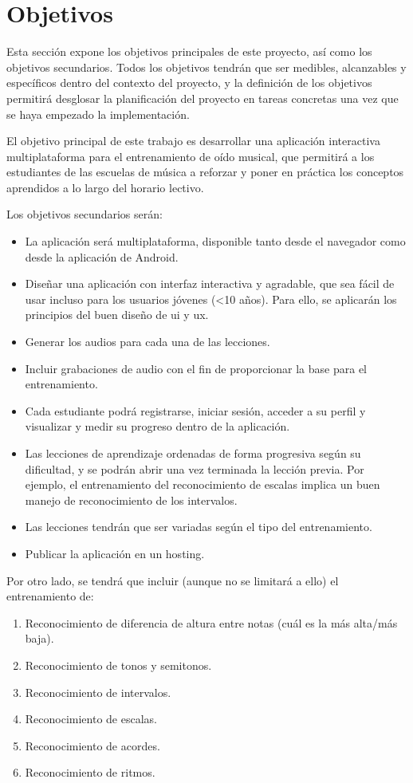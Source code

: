 \section{Objetivos}
\label{objetivos}
Esta sección expone los objetivos principales de este proyecto, así como los objetivos secundarios. Todos los objetivos tendrán que ser medibles, alcanzables y específicos dentro del contexto del proyecto, y la definición de los objetivos permitirá desglosar la planificación del proyecto en tareas concretas una vez que se haya empezado la implementación.
\par El objetivo principal de este trabajo es desarrollar una aplicación interactiva multiplataforma para el entrenamiento de oído musical, que permitirá a los estudiantes de las escuelas de música a reforzar y poner en práctica los conceptos aprendidos a lo largo del horario lectivo.
\par Los objetivos secundarios serán:
\begin{itemize}
	\item La aplicación será multiplataforma, disponible tanto desde el navegador como desde la aplicación de Android.
	\item Diseñar una aplicación con interfaz interactiva y agradable, que sea fácil de usar incluso para los usuarios jóvenes (<10 años). Para ello, se aplicarán los principios del buen diseño de \gls{ui} y \gls{ux}.
	\item Generar los audios para cada una de las lecciones.
	\item Incluir grabaciones de audio con el fin de proporcionar la base para el entrenamiento.
	\item Cada estudiante podrá registrarse, iniciar sesión, acceder a su perfil y visualizar y medir su progreso dentro de la aplicación.
	\item Las lecciones de aprendizaje ordenadas de forma progresiva según su dificultad, y se podrán abrir una vez terminada la lección previa. Por ejemplo, el entrenamiento del reconocimiento de escalas implica un buen manejo de reconocimiento de los intervalos.
	\item Las lecciones tendrán que ser variadas según el tipo del entrenamiento.
	\item Publicar la aplicación en un hosting.
\end{itemize}
\par Por otro lado, se tendrá que incluir (aunque no se limitará a ello) el entrenamiento de:
\begin{enumerate}
	\item Reconocimiento de diferencia de altura entre notas (cuál es la más alta/más baja).
	\item Reconocimiento de tonos y semitonos.
	\item Reconocimiento de intervalos.
	\item Reconocimiento de escalas.
	\item Reconocimiento de acordes.
	\item Reconocimiento de ritmos.
\end{enumerate}

